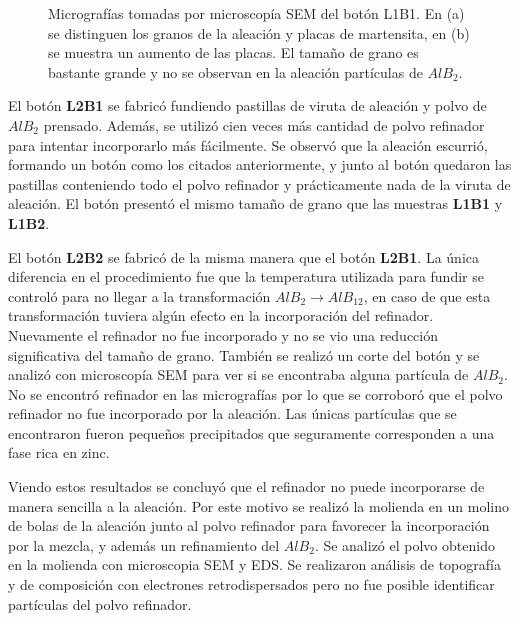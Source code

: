 \documentclass[a4paper,12pt,fleqn,twoside,openany]{book}
\begin{document}
\begin{figure}
\begin{subfigure}{0.4\textwidth}
        \caption{}
        \label{fig:ExpStrain}
    \end{subfigure}
    \caption{Micrografías tomadas por microscopía SEM del botón L1B1. En (a) se distinguen los granos de la aleación y placas de martensita, en (b) se muestra un aumento de las placas. El tamaño de grano es bastante grande y no se observan en la aleación partículas de $AlB_2$.}
    \label{fig:MicroL1B1}
    \end{figure}
 
 El botón \textbf{L2B1} se fabricó fundiendo pastillas de viruta de aleación y polvo de $AlB_2$ prensado. Además, se utilizó cien veces más cantidad de polvo refinador para intentar incorporarlo más fácilmente. Se observó que la aleación escurrió, formando un botón como los citados anteriormente, y junto al botón quedaron las pastillas conteniendo todo el polvo refinador y prácticamente nada de la viruta de aleación. El botón presentó el mismo tamaño de grano que las muestras \textbf{ L1B1} y \textbf{L1B2}.

El botón \textbf{L2B2} se fabricó de la misma manera que el botón \textbf{L2B1}. La única diferencia en el procedimiento fue que la temperatura utilizada para fundir se controló para no llegar a la transformación $AlB_2 \rightarrow AlB_{12}$, en caso de que esta transformación tuviera algún efecto en la incorporación del refinador. Nuevamente el refinador no fue incorporado y no se vio una reducción significativa del tamaño de grano. También se realizó un corte del botón y se analizó con microscopía SEM para ver si se encontraba alguna partícula de $AlB_2$. No se encontró refinador en las micrografías por lo que se corroboró que el polvo refinador no fue incorporado por la aleación. Las únicas partículas que se encontraron fueron pequeños precipitados que seguramente corresponden a una fase rica en zinc.


Viendo estos resultados se concluyó que el refinador no puede incorporarse de manera sencilla a la aleación. Por este motivo se realizó la molienda en un molino de bolas de la aleación junto al polvo refinador para favorecer la incorporación por la mezcla, y además un refinamiento del $AlB_2$. Se analizó el polvo obtenido en la molienda con microscopia SEM y EDS. Se realizaron análisis de topografía y de composición con electrones retrodispersados pero no fue posible identificar partículas del polvo refinador. 
\end{document}
